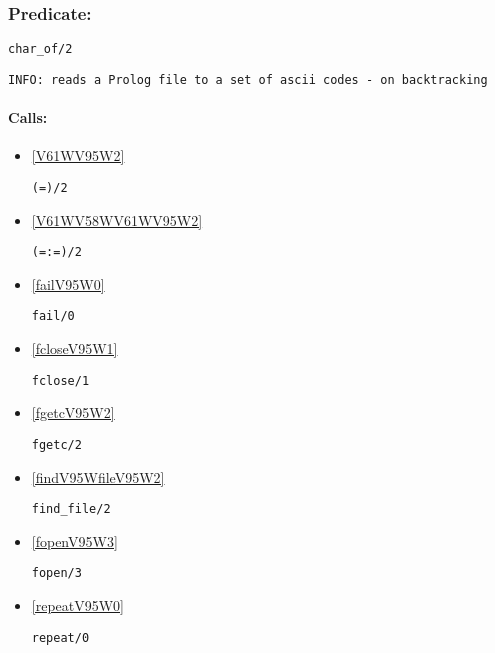 \subsubsection{Predicate:} \label{charV95WofV95W2}

\begin{verbatim}
char_of/2
\end{verbatim}

{\small \begin{verbatim}
INFO: reads a Prolog file to a set of ascii codes - on backtracking

\end{verbatim}}
\paragraph{Calls:} 
\begin{itemize}
\item \ref{V61WV95W2} 
\begin{verbatim}
(=)/2
\end{verbatim}

\item \ref{V61WV58WV61WV95W2} 
\begin{verbatim}
(=:=)/2
\end{verbatim}

\item \ref{failV95W0} 
\begin{verbatim}
fail/0
\end{verbatim}

\item \ref{fcloseV95W1} 
\begin{verbatim}
fclose/1
\end{verbatim}

\item \ref{fgetcV95W2} 
\begin{verbatim}
fgetc/2
\end{verbatim}

\item \ref{findV95WfileV95W2} 
\begin{verbatim}
find_file/2
\end{verbatim}

\item \ref{fopenV95W3} 
\begin{verbatim}
fopen/3
\end{verbatim}

\item \ref{repeatV95W0} 
\begin{verbatim}
repeat/0
\end{verbatim}

\end{itemize}


